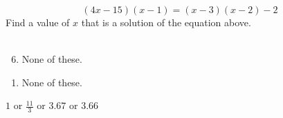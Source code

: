  
$$(4x-15)(x-1)=(x-3)(x-2)-2 $$
Find a value of $x$ that is a solution of the equation above.\\\\


\ifsat
	\begin{enumerate}[label=\Alph*)]
	\end{enumerate}
\else
\fi

\ifacteven
	\begin{enumerate}[label=\textbf{\Alph*.},itemsep=\fill,align=left]
		\setcounter{enumii}{5}
		\item None of these. 
	\end{enumerate}
\else
\fi

\ifactodd
	\begin{enumerate}[label=\textbf{\Alph*.},itemsep=\fill,align=left]
		\item None of these. 
	\end{enumerate}
\else
\fi

\ifgridin
$1$ or $\frac{11}{3}$ or $3.67$ or $3.66$
\else
\fi

